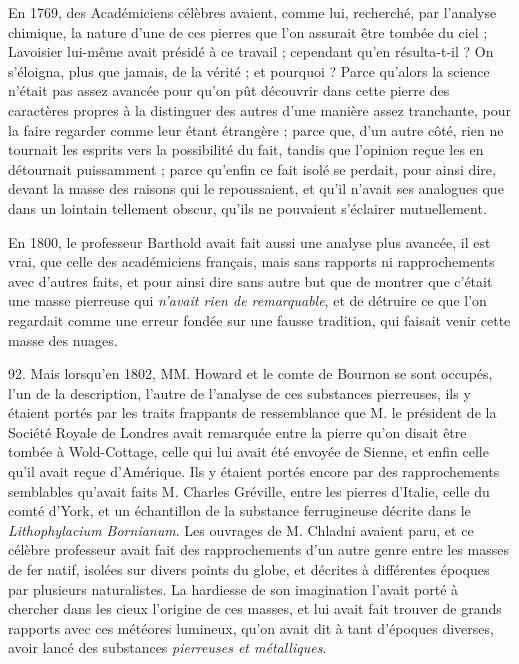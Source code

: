 \documentclass[a4paper, 11pt, oneside, polutonikogreek, french]{article}
\begin{document}
En 1769, des Académiciens célèbres avaient, comme lui, recherché, par l'analyse chimique, la nature d'une de ces pierres que l'on assurait être tombée du ciel ; Lavoisier lui-même avait présidé à ce travail ; cependant qu'en résulta-t-il ? On s'éloigna, plus que jamais, de la vérité ; et pourquoi ? Parce qu'alors la science n'était pas assez avancée pour qu'on pût découvrir dans cette pierre des caractères propres à la distinguer des autres d'une manière assez tranchante, pour la faire regarder comme leur étant étrangère ; parce que, d'un autre côté, rien ne tournait les esprits vers la possibilité du fait, tandis que l'opinion reçue les en détournait puissamment ; parce qu'enfin ce fait isolé se perdait, pour ainsi dire, devant la masse des raisons qui le repoussaient, et qu'il n'avait ses analogues que dans un lointain tellement obscur, qu'ils ne pouvaient s'éclairer mutuellement.

En 1800, le professeur Barthold avait fait aussi une analyse plus avancée, il est vrai, que celle des académiciens français, mais sans rapports ni rapprochements avec d'autres faits, et pour ainsi dire sans autre but que de montrer que c'était une masse pierreuse qui \emph{n'avait rien de remarquable}, et de détruire ce que l'on regardait comme une erreur fondée sur une fausse tradition, qui faisait venir cette masse des nuages.

92. Mais lorsqu'en 1802, MM. Howard et le comte de Bournon se sont occupés, l'un de la description, l'autre de l'analyse de ces substances pierreuses, ils y étaient portés par les traits frappants de ressemblance que M. le président de la Société Royale de Londres avait remarquée entre la pierre qu'on disait être tombée à Wold-Cottage, celle qui lui avait été envoyée de Sienne, et enfin celle qu'il avait reçue d'Amérique. Ils y étaient portés encore par des rapprochements semblables qu'avait faits M. Charles Gréville, entre les pierres d'Italie, celle du comté d'York, et un échantillon de la substance ferrugineuse décrite dans le \emph{Lithophylacium Bornianum}. Les ouvrages de M. Chladni avaient paru, et ce célèbre professeur avait fait des rapprochements d'un autre genre entre les masses de fer natif, isolées sur divers points du globe, et décrites à différentes époques par plusieurs naturalistes. La hardiesse de son imagination l'avait porté à chercher dans les cieux l'origine de ces masses, et lui avait fait trouver de grands rapports avec ces météores lumineux, qu'on avait dit à tant d'époques diverses, avoir lancé des substances \emph{pierreuses et métalliques}.
\end{document}
